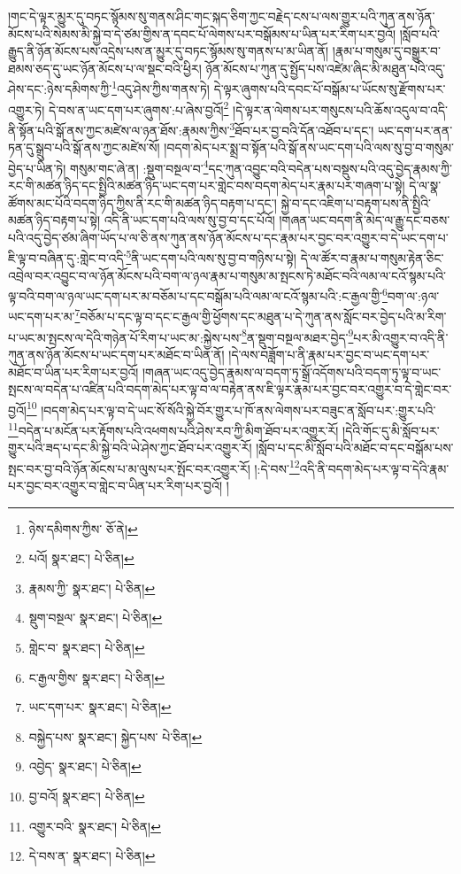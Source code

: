 །གང་དེ་ལྟར་མྱུར་དུ་བཏང་སྙོམས་སུ་གནས་ཤིང་གང་སྐད་ཅིག་ཀྱང་བརྗེད་ངས་པ་ལས་གྱུར་པའི་ཀུན་ནས་ཉོན་མོངས་པའི་སེམས་མི་སྐྱེ་བ་དེ་ཙམ་གྱིས་ན་དབང་པོ་ལེགས་པར་བསྒོམས་པ་ཡིན་པར་རིག་པར་བྱའོ། །སློབ་པའི་རྒྱུད་ནི་ཉོན་མོངས་པས་འདྲེས་པས་ན་མྱུར་དུ་བཏང་སྙོམས་སུ་གནས་པ་མ་ཡིན་ནོ། །རྣམ་པ་གསུམ་དུ་བསྒྱུར་བ་ཐམས་ཅད་དུ་ཡང་ཉོན་མོངས་པ་ལ་སྡང་བའི་ཕྱིར། ཉོན་མོངས་པ་ཀུན་དུ་སྤྱོད་པས་འཛེམ་ཞིང་མི་མཐུན་པའི་འདུ་ཤེས་དང་:ཉེས་དམིགས་ཀྱི་\footnote{ཉེས་དམིགས་ཀྱིས་  ཅོ་ནེ། }འདུ་ཤེས་ཀྱིས་གནས་ཏེ། དེ་ལྟར་ཞུགས་པའི་དབང་པོ་བསྒོམ་པ་ཡོངས་སུ་རྫོགས་པར་འགྱུར་ཏེ། དེ་བས་ན་ཡང་དག་པར་ཞུགས་:པ་ཞེས་བྱའོ།\footnote{པའོ།  སྣར་ཐང་།  པེ་ཅིན། } །དེ་ལྟར་ན་ལེགས་པར་གསུངས་པའི་ཆོས་འདུལ་བ་འདི་ནི་སྟོན་པའི་སྒོ་ནས་ཀྱང་མཛེས་ལ་ཉན་ཐོས་:རྣམས་ཀྱིས་\footnote{རྣམས་ཀྱི་  སྣར་ཐང་།  པེ་ཅིན། }ཐོབ་པར་བྱ་བའི་དོན་འཐོབ་པ་དང་། ཡང་དག་པར་ནན་ཏན་དུ་སྒྲུབ་པའི་སྒོ་ནས་ཀྱང་མཛེས་སོ། །བདག་མེད་པར་སྨྲ་བ་སྟོན་པའི་སྒོ་ནས་ཡང་དག་པའི་ལས་སུ་བྱ་བ་གསུམ་བྱེད་པ་ཡིན་ཏེ། གསུམ་གང་ཞེ་ན། :སྡུག་བསྔལ་བ་\footnote{སྡུག་བསྔལ་  སྣར་ཐང་།  པེ་ཅིན། }དང་ཀུན་འབྱུང་བའི་བདེན་པས་བསྡུས་པའི་འདུ་བྱེད་རྣམས་ཀྱི་རང་གི་མཚན་ཉིད་དང་སྤྱིའི་མཚན་ཉིད་ཡང་དག་པར་གླེང་བས་བདག་མེད་པར་རྣམ་པར་གཞག་པ་སྟེ། དེ་ལ་སྣ་ཚོགས་མང་པོའི་བདག་ཉིད་ཀྱིས་ནི་རང་གི་མཚན་ཉིད་བརྟག་པ་དང་། སྐྱེ་བ་དང་འཇིག་པ་བརྟག་པས་ནི་སྤྱིའི་མཚན་ཉིད་བརྟག་པ་སྟེ། འདི་ནི་ཡང་དག་པའི་ལས་སུ་བྱ་བ་དང་པོའོ། །གཞན་ཡང་བདག་ནི་མེད་ལ་རྒྱུ་དང་བཅས་པའི་འདུ་བྱེད་ཙམ་ཞིག་ཡོད་པ་ལ་ཅི་ནས་ཀུན་ནས་ཉོན་མོངས་པ་དང་རྣམ་པར་བྱང་བར་འགྱུར་བ་དེ་ཡང་དག་པ་ཇི་ལྟ་བ་བཞིན་དུ་:གླེང་བ་འདི་\footnote{གླེང་བ་  སྣར་ཐང་།  པེ་ཅིན། }ནི་ཡང་དག་པའི་ལས་སུ་བྱ་བ་གཉིས་པ་སྟེ། དེ་ལ་ཚོར་བ་རྣམ་པ་གསུམ་རྟེན་ཅིང་འབྲེལ་བར་འབྱུང་བ་ལ་ཉོན་མོངས་པའི་བག་ལ་ཉལ་རྣམ་པ་གསུམ་མ་སྤངས་ཏེ་མཐོང་བའི་ལམ་ལ་ངའོ་སྙམ་པའི་ལྟ་བའི་བག་ལ་ཉལ་ཡང་དག་པར་མ་བཅོམ་པ་དང་བསྒོམ་པའི་ལམ་ལ་ངའོ་སྙམ་པའི་:ང་རྒྱལ་གྱི་\footnote{ང་རྒྱལ་གྱིས་  སྣར་ཐང་།  པེ་ཅིན། }བག་ལ་:ཉལ་ཡང་དག་པར་མ་\footnote{ཡང་དག་པར་  སྣར་ཐང་།  པེ་ཅིན། }བཅོམ་པ་དང་ལྟ་བ་དང་ང་རྒྱལ་གྱི་ཕྱོགས་དང་མཐུན་པ་དེ་ཀུན་ནས་སློང་བར་བྱེད་པའི་མ་རིག་པ་ཡང་མ་སྤངས་ལ་དེའི་གཉེན་པོ་རིག་པ་ཡང་མ་:སྐྱེས་པས་\footnote{བསྐྱེད་པས་  སྣར་ཐང་། སྐྱེད་པས་  པེ་ཅིན། }ན་སྡུག་བསྔལ་མཐར་བྱེད་\footnote{འབྱེད་  སྣར་ཐང་།  པེ་ཅིན། }པར་མི་འགྱུར་བ་འདི་ནི་ཀུན་ནས་ཉོན་མོངས་པ་ཡང་དག་པར་མཐོང་བ་ཡིན་ནོ། །དེ་ལས་བཟློག་པ་ནི་རྣམ་པར་བྱང་བ་ཡང་དག་པར་མཐོང་བ་ཡིན་པར་རིག་པར་བྱའོ། །གཞན་ཡང་འདུ་བྱེད་རྣམས་ལ་བདག་ཏུ་སྒྲོ་འདོགས་པའི་བདག་ཏུ་ལྟ་བ་ཡང་སྤངས་ལ་བདེན་པ་འཛིན་པའི་བདག་མེད་པར་ལྟ་བ་ལ་བརྟེན་ནས་ཇི་ལྟར་རྣམ་པར་བྱང་བར་འགྱུར་བ་དེ་གླེང་བར་བྱའོ།\footnote{བྱ་བའོ།  སྣར་ཐང་།  པེ་ཅིན། } །བདག་མེད་པར་ལྟ་བ་དེ་ཡང་སོ་སོའི་སྐྱེ་བོར་གྱུར་པ་ཁོ་ནས་ལེགས་པར་བཟུང་ན་སློབ་པར་:གྱུར་པའི་\footnote{འགྱུར་བའི་  སྣར་ཐང་།  པེ་ཅིན། }བདེན་པ་མངོན་པར་རྟོགས་པའི་འཕགས་པའི་ཤེས་རབ་ཀྱི་མིག་ཐོབ་པར་འགྱུར་རོ། །དེའི་གོང་དུ་མི་སློབ་པར་གྱུར་པའི་ཟད་པ་དང་མི་སྐྱེ་བའི་ཡེ་ཤེས་ཀྱང་ཐོབ་པར་འགྱུར་རོ། །སློབ་པ་དང་མི་སློབ་པའི་མཐོང་བ་དང་བསྒོམ་པས་སྤང་བར་བྱ་བའི་ཉོན་མོངས་པ་མ་ལུས་པར་སྤོང་བར་འགྱུར་རོ། །:དེ་བས་\footnote{དེ་བས་ན་  སྣར་ཐང་།  པེ་ཅིན། }འདི་ནི་བདག་མེད་པར་ལྟ་བ་དེའི་རྣམ་པར་བྱང་བར་འགྱུར་བ་གླེང་བ་ཡིན་པར་རིག་པར་བྱའོ། །
